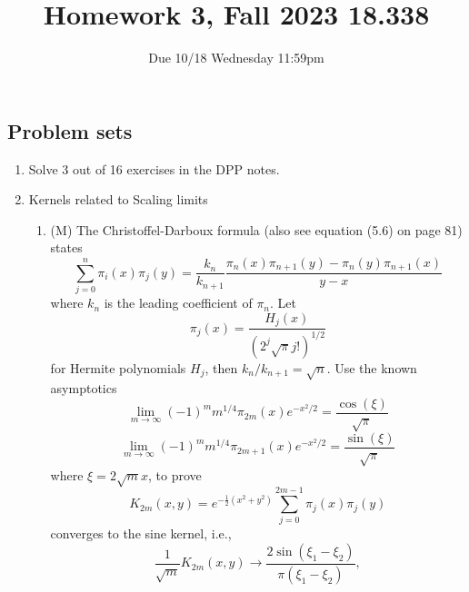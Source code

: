 \documentclass{article}
\title{Homework 3, Fall 2023 18.338}
\author{Due 10/18 Wednesday 11:59pm}
\date{}
\begin{document}
\maketitle




\subsection*{Problem sets}
\begin{enumerate}
    \item Solve 3 out of 16 exercises in the DPP notes.
    \item Kernels related to Scaling limits
    \begin{enumerate}
        \item (M) The Christoffel-Darboux formula (also see equation (5.6) on page 81) states
        \begin{equation*}
            \sum_{j=0}^n\pi_i(x)\pi_j(y) = \frac{k_n}{k_{n+1}}\frac{\pi_n(x)\pi_{n+1}(y)-\pi_n(y)\pi_{n+1}(x)}{y-x}
        \end{equation*}
        where $k_n$ is the leading coefficient of $\pi_n$. Let 
        \begin{equation*}
            \pi_j(x) = \frac{H_j(x)}{(2^j\sqrt\pi j!)^{1/2}}
        \end{equation*}
        for Hermite polynomials $H_j$, then $k_n/k_{n+1} = \sqrt{n}$. Use the known asymptotics
        \begin{equation*}
            \lim_{m\to\infty}(-1)^m m^{1/4}\pi_{2m}(x)e^{-x^2/2} = \frac{\cos(\xi)}{\sqrt{\pi}}
        \end{equation*}
        \begin{equation*}
            \lim_{m\to\infty}(-1)^m m^{1/4}\pi_{2m+1}(x)e^{-x^2/2} = \frac{\sin(\xi)}{\sqrt{\pi}}
        \end{equation*}
        where $\xi = 2\sqrt{m}x$, to prove 
        \begin{equation*}
            K_{2m}(x, y) = e^{-\frac{1}{2}(x^2+y^2)}\sum_{j=0}^{2m-1}\pi_j(x)\pi_j(y)
        \end{equation*}
        converges to the sine kernel, i.e., 
        \begin{equation*}
            \frac{1}{\sqrt{m}}K_{2m}(x, y) \to \frac{2\sin(\xi_1-\xi_2)}{\pi(\xi_1-\xi_2)},

\end{equation*}
\end{enumerate}
\end{enumerate}
\end{document}
